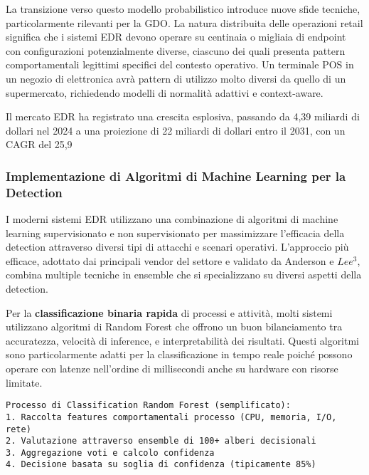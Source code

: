 {La transizione verso questo modello probabilistico introduce nuove sfide tecniche, particolarmente rilevanti per la GDO. La natura distribuita delle operazioni retail significa che i sistemi EDR devono operare su centinaia o migliaia di endpoint con configurazioni potenzialmente diverse, ciascuno dei quali presenta pattern comportamentali legittimi specifici del contesto operativo. Un terminale POS in un negozio di elettronica avrà pattern di utilizzo molto diversi da quello di un supermercato, richiedendo modelli di normalità adattivi e context-aware.

Il mercato EDR ha registrato una crescita esplosiva, passando da 4,39 miliardi di dollari nel 2024 a una proiezione di 22 miliardi di dollari entro il 2031, con un CAGR del 25,9%

\subsubsection{Implementazione di Algoritmi di Machine Learning per la Detection}

I moderni sistemi EDR utilizzano una combinazione di algoritmi di machine learning supervisionato e non supervisionato per massimizzare l'efficacia della detection attraverso diversi tipi di attacchi e scenari operativi. L'approccio più efficace, adottato dai principali vendor del settore e validato da Anderson e $Lee$$^{3}$, combina multiple tecniche in ensemble che si specializzano su diversi aspetti della detection.

Per la \textbf{classificazione binaria rapida} di processi e attività, molti sistemi utilizzano algoritmi di Random Forest che offrono un buon bilanciamento tra accuratezza, velocità di inference, e interpretabilità dei risultati. Questi algoritmi sono particolarmente adatti per la classificazione in tempo reale poiché possono operare con latenze nell'ordine di millisecondi anche su hardware con risorse limitate.

\begin{verbatim}
Processo di Classification Random Forest (semplificato):
1. Raccolta features comportamentali processo (CPU, memoria, I/O, rete)
2. Valutazione attraverso ensemble di 100+ alberi decisionali
3. Aggregazione voti e calcolo confidenza
4. Decisione basata su soglia di confidenza (tipicamente 85%)
\end{verbatim}

}
